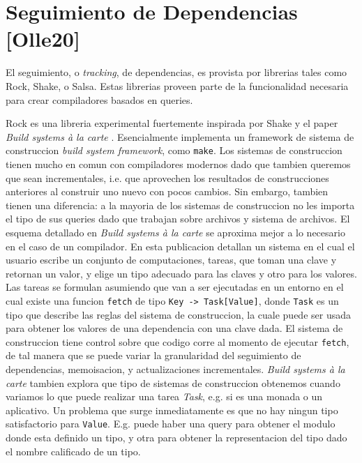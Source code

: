 \documentclass[12pt, a4paper]{report}
\begin{document}
\section*{Seguimiento de Dependencias [Olle20]}

El seguimiento, o \textit{tracking}, de dependencias, es provista por librerias tales como Rock, Shake, o Salsa.
Estas librerias proveen parte de la funcionalidad necesaria para crear compiladores basados en queries.

Rock es una libreria experimental fuertemente inspirada por Shake y el paper \textit{Build systems à la carte} \cite{mokhov2018build}.
Esencialmente implementa un framework de sistema de construccion \textit{build system framework}, como \texttt{make}.
Los sistemas de construccion tienen mucho en comun con compiladores modernos dado que tambien queremos que sean incrementales, i.e. que aprovechen los resultados de construcciones anteriores al construir uno nuevo con pocos cambios.
Sin embargo, tambien tienen una diferencia: a la mayoria de los sistemas de construccion no les importa el tipo de sus queries dado que trabajan sobre archivos y sistema de archivos.
El esquema detallado en \textit{Build systems à la carte} se aproxima mejor a lo necesario en el caso de un compilador.
En esta publicacion detallan un sistema en el cual el usuario escribe un conjunto de computaciones, tareas, que toman una clave y retornan un valor, y elige un tipo adecuado para las claves y otro para los valores.
Las tareas se formulan asumiendo que van a ser ejecutadas en un entorno en el cual existe una funcion \texttt{fetch} de tipo \texttt{Key -> Task[Value]}, donde \texttt{Task} es un tipo que describe las reglas del sistema de construccion, la cuale puede ser usada para obtener los valores de una dependencia con una clave dada.
El sistema de construccion tiene control sobre que codigo corre al momento de ejecutar \texttt{fetch}, de tal manera que se puede variar la granularidad del seguimiento de dependencias, memoisacion, y actualizaciones incrementales.
\textit{Build systems à la carte} tambien explora que tipo de sistemas de construccion obtenemos cuando variamos lo que puede realizar una tarea \textit{Task}, e.g. si es una monada o un aplicativo.
Un problema que surge inmediatamente es que no hay ningun tipo satisfactorio para \texttt{Value}.
E.g. puede haber una query para obtener el modulo donde esta definido un tipo, y otra para obtener la representacion del tipo dado el nombre calificado de un tipo.
\cite{olle_query_based}
\end{document}
